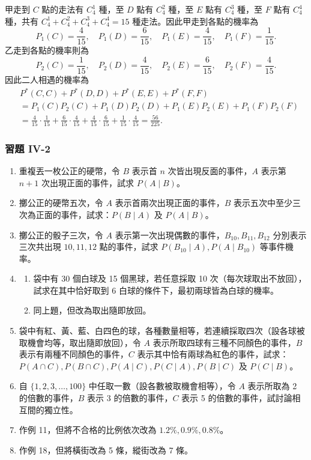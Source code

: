 \medskip
\noindent 甲走到 $C$ 點的走法有 $C^1_4$ 種，至 $D$ 點有 $C^2_4$ 種，至 $E$ 點有 $C^3_4$ 種，至 $F$ 點有 $C^4_4$ 種，共有 $C^1_4 + C^2_4 + C^3_4 + C^4_4 = 15$ 種走法。因此甲走到各點的機率為
\[
P_1(C) = \frac{4}{15}, \quad P_1(D) = \frac{6}{15}, \quad P_1(E) = \frac{4}{15}, \quad P_1(F) = \frac{1}{15}.
\]
乙走到各點的機率則為
\[
P_2(C) = \frac{1}{15}, \quad P_2(D) = \frac{4}{15}, \quad P_2(E) = \frac{6}{15}, \quad P_2(F) = \frac{4}{15}.
\]
因此二人相遇的機率為
\begin{align*}
& P^*(C, C) + P^*(D, D) + P^*(E, E) + P^*(F, F) \\
&= P_1(C)P_2(C) + P_1(D)P_2(D) + P_1(E)P_2(E) + P_1(F)P_2(F) \\
&= \frac{4}{15} \cdot \frac{1}{15} + \frac{6}{15} \cdot \frac{4}{15} + \frac{4}{15} \cdot \frac{6}{15} + \frac{1}{15} \cdot \frac{4}{15} = \frac{56}{225}. \tag*{\#}
\end{align*}

\vspace{1.5em}
\subsubsection*{習題 IV-2}\label{sec:b5-ex4-2}

\begin{enumerate}[label=\textbf{\arabic*.}]
  \item 重複丟一枚公正的硬幣，令 $B$ 表示首 $n$ 次皆出現反面的事件，$A$ 表示第 $n+1$ 次出現正面的事件，試求 $P(A\mid B)$。
  \item 擲公正的硬幣五次，令 $A$ 表示首兩次出現正面的事件，$B$ 表示五次中至少三次為正面的事件，試求：$P(B\mid A)$ 及 $P(A\mid B)$。
  \item 擲公正的骰子三次，令 $A$ 表示第一次出現偶數的事件，$B_{10}, B_{11}, B_{12}$ 分別表示三次共出現 $10, 11, 12$ 點的事件，試求 $P(B_{10}\mid A), P(A\mid B_{10})$ 等事件機率。
  \item 
  \begin{enumerate}[label=(\arabic*)]
    \item 袋中有 30 個白球及 15 個黑球，若任意採取 10 次（每次球取出不放回），試求在其中恰好取到 6 白球的條件下，最初兩球皆為白球的機率。
    \item 同上題，但改為取出隨即放回。
  \end{enumerate}
  \item 袋中有紅、黃、藍、白四色的球，各種數量相等，若連續採取四次（設各球被取機會均等，取出隨即放回），令 $A$ 表示所取四球有三種不同顏色的事件，$B$ 表示有兩種不同顏色的事件，$C$ 表示其中恰有兩球為紅色的事件，試求：$P(A \cap C), P(B \cap C), P(A\mid C), P(C\mid A), P(B\mid C)$ 及 $P(C\mid B)$。
  \item 自 $\{1, 2, 3, \dots, 100\}$ 中任取一數（設各數被取機會相等），令 $A$ 表示所取為 2 的倍數的事件，$B$ 表示 3 的倍數的事件，$C$ 表示 5 的倍數的事件，試討論相互間的獨立性。
  \item 作例 11，但將不合格的比例依次改為 $1.2\%, 0.9\%, 0.8\%$。
  \item 作例 18，但將橫街改為 5 條，縱街改為 7 條。
\end{enumerate}

